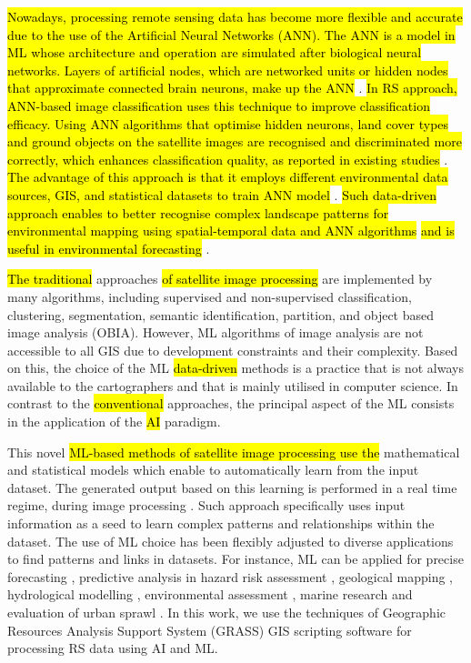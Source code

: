 \documentclass[final,5p,times,twocolumn]{elsarticle}
\numberwithin{table}{section}
\begin{document}
\hl{Nowadays, processing remote sensing data has become more flexible and accurate due to the use of the Artificial Neural Networks (ANN). The ANN is a model in ML whose architecture and operation are simulated after biological neural networks. Layers of artificial nodes, which are networked units or hidden nodes that approximate connected brain neurons, make up the ANN} \cite{10448202,9803057}. \hl{In RS approach, ANN-based image classification uses this technique to improve classification efficacy. Using ANN algorithms that optimise hidden neurons, land cover types and ground objects on the satellite images are recognised and discriminated more correctly, which enhances classification quality, as reported in existing studies} \cite{7429586,jmse12050709,8898672,jmse12081279,Kotaridis}. \hl{The advantage of this approach is that it employs different environmental data sources, GIS, and statistical datasets to train ANN model} \cite{Seyed}. \hl{Such data-driven approach enables to better recognise complex landscape patterns for environmental mapping using spatial-temporal data and ANN algorithms} \cite{SMIDA2023104245} \hl{and is useful in environmental forecasting} \cite{SHAO2024117816,VU2019118}. 

\hl{The traditional} approaches \hl{of satellite image processing} are implemented by many algorithms, including supervised and non-supervised classification, clustering, segmentation, semantic identification, partition, and object based image analysis (OBIA). However, ML algorithms of image analysis are not accessible to all GIS due to development constraints and their complexity. Based on this, the choice of the ML \hl{data-driven} methods is a practice that is not always available to the cartographers and that is mainly utilised in computer science. In contrast to the \hl{conventional} approaches, the principal aspect of the ML consists in the application of the \hl{AI} paradigm. 

This novel \hl{ML-based methods of satellite image processing use the }mathematical and statistical models which enable to automatically learn from the input dataset. The generated output based on this learning is performed in a real time regime, during image processing \cite{DOSSANTOS2022106753,ROCHA2022107415}. Such approach specifically uses input information as a seed to learn complex patterns and relationships within the dataset. The use of ML choice has been flexibly adjusted to diverse applications to find patterns and links in datasets. For instance, ML can be applied for precise forecasting \cite{LATIF202316}, predictive analysis in hazard risk assessment \cite{XIONG2021145256,WU2024103612}, geological mapping \cite{HAN202387,ELSAYED202423}, hydrological modelling \cite{RAFIK2023101569,AOURAGH2023100939}, environmental assessment \cite{AMANI2023108324}, marine research \cite{ERDEM2021964} and evaluation of urban sprawl \cite{LI2023104653}. In this work, we use the techniques of Geographic Resources Analysis Support System (GRASS) GIS scripting software \cite{NETELER2012124} for processing RS data using AI and ML.
\end{document}
